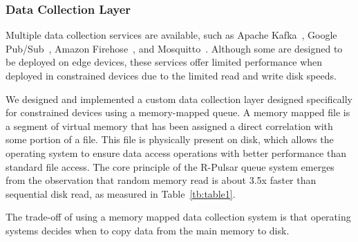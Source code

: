 \subsubsection{Data Collection Layer}

Multiple data collection services are available, such as Apache Kafka~\cite{kafka}, Google Pub/Sub~\cite{google}, Amazon Firehose~\cite{amazon}, and Mosquitto~\cite{mosquitto}. Although some are designed to be deployed on edge devices, these services offer limited performance when deployed in constrained devices due to the limited read and write disk speeds.

We designed and implemented a custom data collection layer designed specifically for constrained devices using a memory-mapped queue. A memory mapped file is a segment of virtual memory that has been assigned a direct correlation with some portion of a file. This file is physically present on disk, which allows the operating system to ensure data access operations with better performance than standard file access. The core principle of the R-Pulsar queue system emerges from the observation that random memory read is about 3.5x faster than sequential disk read, as measured in Table~\ref{tb:table1}. 

The trade-off of using a memory mapped data collection system is that operating systems decides when to copy data from the main memory to disk. %

\begin{table}[h!]
\centering
\caption{Measurements of Disk I/O vs RAM memory performance on a Raspberry Pi.} \label{tb:table1}
\end{table}


